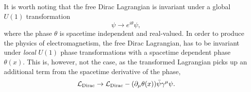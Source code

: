 It is worth noting that the free Dirac Lagrangian is invariant under a global $U(1)$ transformation
\begin{equation}
	\psi \rightarrow e^{i\theta}\psi,
\end{equation}
where the phase $\theta$ is spacetime independent and real-valued. In order to produce the physics of electromagnetism, the free Dirac Lagrangian, has to be invariant under \textit{local} $U(1)$ phase transformations with a spacetime dependent phase $\theta(x)$. This is, however, not the case, as the transformed Lagrangian picks up an additional term from the spacetime derivative of the phase,
\begin{equation}
	\mathcal{L}_\mathrm{Dirac} \to \mathcal{L}_\mathrm{Dirac} - (\partial_\mu\theta(x))\bar{\psi}\gamma^\mu\psi.
\end{equation}

